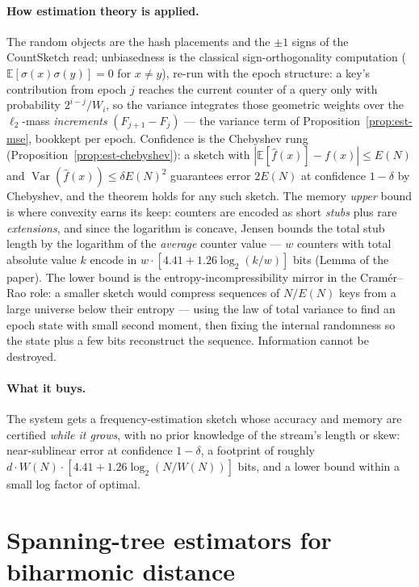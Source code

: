 \paragraph{How estimation theory is applied.}
The random objects are the hash placements and the $\pm1$ signs of the CountSketch read;
unbiasedness is the classical sign-orthogonality computation ($\mathbb{E}[\sigma(x)\sigma(y)] = 0$
for $x \ne y$), re-run with the epoch structure: a key's contribution from epoch $j$ reaches the
current counter of a query only with probability $2^{i-j}/W_i$, so the variance integrates those
geometric weights over the $\ell_2$-mass \emph{increments} $(F_{j+1}-F_j)$ --- the variance term
of Proposition~\ref{prop:est-mse}, bookkept per epoch. Confidence is the Chebyshev rung
(Proposition~\ref{prop:est-chebyshev}): a sketch with $|\mathbb{E}[\hat f(x)] - f(x)| \le E(N)$ and
$\operatorname{Var}(\hat f(x)) \le \delta E(N)^2$ guarantees error $2E(N)$ at confidence
$1-\delta$ by Chebyshev, and the theorem holds for any such sketch. The memory \emph{upper}
bound is where convexity earns its keep: counters are encoded as short \emph{stubs} plus rare
\emph{extensions}, and since the logarithm is concave, Jensen bounds the total stub length by
the logarithm of the \emph{average} counter value --- $w$ counters with total absolute value
$k$ encode in $w\cdot[4.41 + 1.26\log_2(k/w)]$ bits (Lemma of the paper). The lower bound is
the entropy-incompressibility mirror in the Cram\'er--Rao role: a smaller sketch would compress
sequences of $N/E(N)$ keys from a large universe below their entropy --- using the law of total
variance to find an epoch state with small second moment, then fixing the internal randomness
so the state plus a few bits reconstruct the sequence. Information cannot be destroyed.

\paragraph{What it buys.}
The system gets a frequency-estimation sketch whose accuracy and memory are certified
\emph{while it grows}, with no prior knowledge of the stream's length or skew: near-sublinear
error at confidence $1-\delta$, a footprint of roughly $d\cdot W(N)\cdot[4.41 +
1.26\log_2(N/W(N))]$ bits, and a lower bound within a small log factor of optimal.

\section{Spanning-tree estimators for biharmonic distance}
\label{sec:est-bd}

